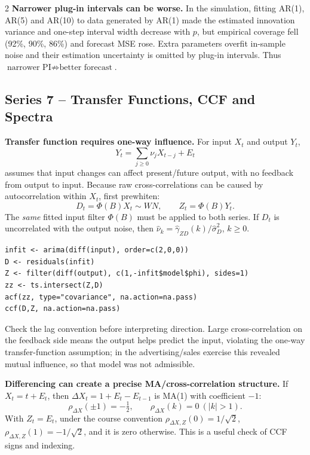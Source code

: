 \documentclass[9pt,a4paper]{extarticle}
\newcommand{\key}[1]{\textbf{#1}}
\begin{document}
\begin{multicols}{2}
\key{Narrower plug-in intervals can be worse.} In the simulation, fitting AR(1), AR(5) and AR(10) to data generated by AR(1) made the estimated innovation variance and one-step interval width decrease with \(p\), but empirical coverage fell (92\%, 90\%, 86\%) and forecast MSE rose. Extra parameters overfit in-sample noise and their estimation uncertainty is omitted by plug-in intervals. Thus \(\boxed{\text{narrower PI}\not\Rightarrow\text{better forecast}}\).

\subsection*{Series 7 -- Transfer Functions, CCF and Spectra}

\key{Transfer function requires one-way influence.} For input \(X_t\) and output \(Y_t\),
\[
Y_t=\sum_{j\ge0}\nu_jX_{t-j}+E_t
\]
assumes that input changes can affect present/future output, with no feedback from output to input. Because raw cross-correlations can be caused by autocorrelation within \(X_t\), first prewhiten:
\[
D_t=\Phi(B)X_t\sim WN,\qquad Z_t=\Phi(B)Y_t.
\]
The \emph{same} fitted input filter \(\Phi(B)\) must be applied to both series. If \(D_t\) is uncorrelated with the output noise, then
\(\widehat\nu_k=\widehat\gamma_{ZD}(k)/\widehat\sigma_D^2\), \(k\ge0\).
{\scriptsize
\begin{verbatim}
infit <- arima(diff(input), order=c(2,0,0))
D <- residuals(infit)
Z <- filter(diff(output), c(1,-infit$model$phi), sides=1)
zz <- ts.intersect(Z,D)
acf(zz, type="covariance", na.action=na.pass)
ccf(D,Z, na.action=na.pass)
\end{verbatim}}
Check the lag convention before interpreting direction. Large cross-correlation on the feedback side means the output helps predict the input, violating the one-way transfer-function assumption; in the advertising/sales exercise this revealed mutual influence, so that model was not admissible.

\key{Differencing can create a precise MA/cross-correlation structure.} If \(X_t=t+E_t\), then
\(\Delta X_t=1+E_t-E_{t-1}\) is MA(1) with coefficient \(-1\):
\[
\rho_{\Delta X}(\pm1)=-\tfrac12,\qquad \rho_{\Delta X}(k)=0\ (|k|>1).
\]
With \(Z_t=E_t\), under the course convention
\(\rho_{\Delta X,Z}(0)=1/\sqrt2\), \(\rho_{\Delta X,Z}(1)=-1/\sqrt2\), and it is zero otherwise. This is a useful check of CCF signs and indexing.


\end{multicols}
\end{document}
